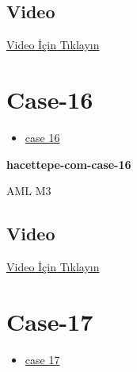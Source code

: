 \documentclass[
  letterpaper,
  DIV=11,
  numbers=noendperiod]{scrreprt}
\providecommand{\tightlist}{%
  \setlength{\itemsep}{0pt}\setlength{\parskip}{0pt}}\usepackage{longtable,booktabs,array}
\begin{document}
\hypertarget{video-13}{%
\subsection{Video}\label{video-13}}

\href{https://www.youtube.com/watch?v=3lmx9hYGcG8}{Video İçin Tıklayın}

\hypertarget{sec-hacettepe-case-of-the-month-case-16}{%
\section{Case-16}\label{sec-hacettepe-case-of-the-month-case-16}}

\begin{itemize}
\tightlist
\item
  \href{https://www.youtube.com/watch?v=Tkempcd59I0\&ab_channel=KemalKosemehmetoglu}{case
  16}
\end{itemize}

\textbf{hacettepe-com-case-16}

\begin{tcolorbox}[enhanced jigsaw, colbacktitle=quarto-callout-tip-color!10!white, colback=white, titlerule=0mm, opacityback=0, colframe=quarto-callout-tip-color-frame, opacitybacktitle=0.6, bottomrule=.15mm, breakable, coltitle=black, title=\textcolor{quarto-callout-tip-color}{\faLightbulb}\hspace{0.5em}{Tanı}, toprule=.15mm, toptitle=1mm, bottomtitle=1mm, arc=.35mm, rightrule=.15mm, leftrule=.75mm, left=2mm]

AML M3

\end{tcolorbox}

\hypertarget{video-14}{%
\subsection{Video}\label{video-14}}

\href{https://www.youtube.com/watch?v=Tkempcd59I0}{Video İçin Tıklayın}

\hypertarget{sec-hacettepe-case-of-the-month-case-17}{%
\section{Case-17}\label{sec-hacettepe-case-of-the-month-case-17}}

\begin{itemize}
\tightlist
\item
  \href{https://www.youtube.com/watch?v=zlewGuN0BBY\&ab_channel=KemalKosemehmetoglu}{case
  17}
\end{itemize}
\end{document}
